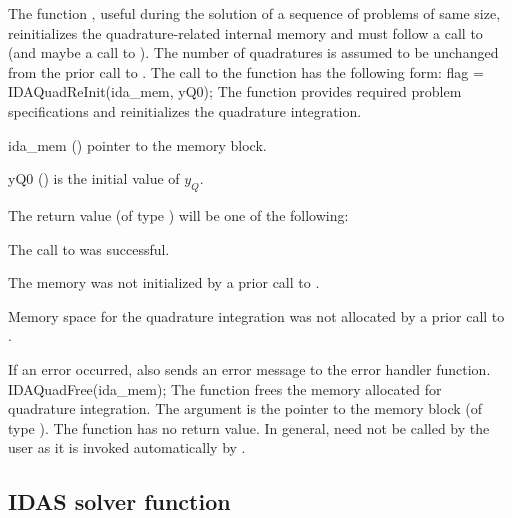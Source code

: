 {The function , useful during the solution of a
sequence of problems of same size, reinitializes the quadrature-related
internal memory and must follow a call to  (and maybe
a call to ).  The number  of quadratures is
assumed to be unchanged from the prior call to .  The
call to the  function has the following form:
{
  flag = IDAQuadReInit(ida\_mem, yQ0);
}
{
  The function  provides required problem specifications 
  and reinitializes the quadrature integration.
}
{
  \begin{args}
  \item[ida\_mem] ()
    pointer to the {\idas} memory block.
  \item[yQ0] ()
    is the initial value of $y_Q$.
  \end{args}
}
{
  The return value  (of type ) will be one of the following:
  \begin{args}
  \item[\Id{IDA\_SUCCESS}]
    The call to  was successful.
  \item[\Id{IDA\_MEM\_NULL}] 
    The {\idas} memory was not initialized by a prior call to .
  \item[\Id{IDA\_NO\_QUAD}] 
    Memory space for the quadrature integration was not allocated by a prior
    call to .
  \end{args}
}
{
  If an error occurred,  also sends an error message to the
  error handler function.
}
{
  IDAQuadFree(ida\_mem);
}
{
  The function  frees the memory allocated for quadrature integration.
}
{
  The argument is the pointer to the {\idas} memory block (of type ).
}
{
  The function  has no return value.
}
{
  In general,  need not be called by the user as it is
  invoked automatically by .
}


\subsection{IDAS solver function}

}
